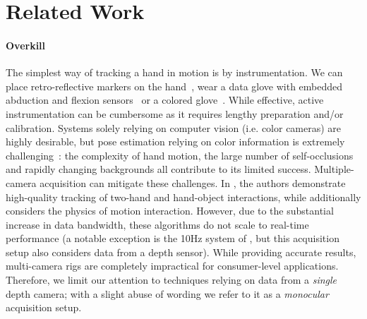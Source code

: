 

% 
\section{Related Work}
\label{sec:related}
\paragraph{Overkill} %
The simplest way of tracking a hand in motion is by instrumentation. We can place retro-reflective markers on the hand~\cite{zhao2012marker}, wear a data glove with embedded abduction and flexion sensors~\cite{dipietro2008survey} or a colored glove~\cite{wang2009colorglove}. While effective, active instrumentation can be cumbersome as it requires lengthy preparation and/or calibration. Systems solely relying on computer vision (i.e. color cameras) are highly desirable, but pose estimation  relying on color information is extremely challenging~\cite{erol2007survey}: the complexity of hand motion, the large number of self-occlusions and rapidly changing backgrounds all contribute to its limited success. Multiple-camera acquisition can mitigate these challenges. In \cite{ballan2013salient}, the authors demonstrate high-quality tracking of two-hand and hand-object interactions, while \cite{wang2013physics} additionally considers the physics of motion interaction. However, due to the substantial increase in data bandwidth, these algorithms do not scale to real-time performance (a notable exception is the 10Hz system of  \cite{sridhar2013multicam}, but this acquisition setup also considers data from a depth sensor). While providing accurate results, multi-camera rigs are completely impractical for consumer-level applications. Therefore, we limit our attention to techniques relying on data from a \emph{single} depth camera; with a slight abuse of wording we refer to it as a \emph{monocular} acquisition setup.

